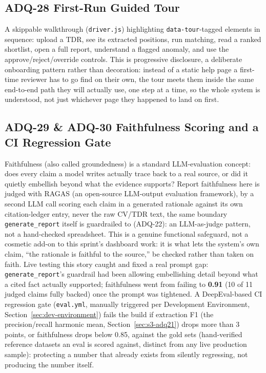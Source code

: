 \subsection{ADQ-28 First-Run Guided Tour}

A skippable walkthrough (\texttt{driver.js}) highlighting
\texttt{data-tour}-tagged elements in sequence: upload a TDR, see its
extracted positions, run matching, read a ranked shortlist, open a full
report, understand a flagged anomaly, and use the approve/reject/override
controls. This is progressive disclosure, a deliberate onboarding
pattern rather than decoration: instead of a static help page a
first-time reviewer has to go find on their own, the tour meets them
inside the same end-to-end path they will actually use, one step at a
time, so the whole system is understood, not just whichever page they
happened to land on first.

\subsection{ADQ-29 \& ADQ-30 Faithfulness Scoring and a CI Regression Gate}

Faithfulness (also called groundedness) is a standard LLM-evaluation
concept: does every claim a model writes actually trace back to a real
source, or did it quietly embellish beyond what the evidence supports?
Report faithfulness here is judged with RAGAS (an open-source
LLM-output evaluation framework), by a second LLM call scoring each
claim in a generated rationale against its own citation-ledger entry,
never the raw CV/TDR text, the same boundary \texttt{generate\_report}
itself is guardrailed to (ADQ-22): an LLM-as-judge pattern, not a
hand-checked spreadsheet. This is a genuine functional safeguard, not a
cosmetic add-on to this sprint's dashboard work: it is what lets the
system's own claim, ``the rationale is faithful to the source,'' be
checked rather than taken on faith. Live testing this story caught and
fixed a real prompt gap: \texttt{generate\_report}'s guardrail had been
allowing embellishing detail beyond what a cited fact actually
supported; faithfulness went from failing to \textbf{0.91} (10 of 11
judged claims fully backed) once the prompt was tightened. A
DeepEval-based CI regression gate (\texttt{eval.yml}, manually triggered
per Development Environment, Section~\ref{sec:dev-environment}) fails
the build if extraction F1 (the precision/recall harmonic mean,
Section~\ref{sec:s3-adq21}) drops more than 3 points, or faithfulness
drops below 0.85, against the gold sets (hand-verified reference
datasets an eval is scored against, distinct from any live production
sample): protecting a number that already exists from silently
regressing, not producing the number itself.

